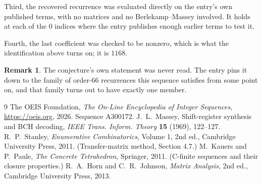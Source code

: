 \documentclass[11pt,a4paper]{article}
\theoremstyle{plain}
\theoremstyle{definition}
\newtheorem{remark}[theorem]{Remark}
\begin{document}
Third, the recovered recurrence was evaluated directly on the entry's own published terms, with
no matrices and no Berlekamp--Massey involved. It holds at each of the $0$ indices where
the entry publishes enough earlier terms to test it.

Fourth, the last coefficient was checked to be nonzero, which is what the identification above
turns on; it is $1168$.

\begin{remark}
The conjecture's own statement was never read. The entry pins it down to the family of
order-$66$ recurrences this sequence satisfies from some point on, and that family turns
out to have exactly one member.
\end{remark}

\begin{thebibliography}{9}
 The OEIS Foundation, \emph{The On-Line Encyclopedia of Integer
Sequences}, \url{https://oeis.org}, 2026. Sequence A300172.
 J.~L.~Massey, Shift-register synthesis and BCH decoding, \emph{IEEE
Trans. Inform. Theory} \textbf{15} (1969), 122--127.
 R.~P.~Stanley, \emph{Enumerative Combinatorics}, Volume 1, 2nd ed.,
Cambridge University Press, 2011. (Transfer-matrix method, Section 4.7.)
 M.~Kauers and P.~Paule, \emph{The Concrete Tetrahedron}, Springer, 2011.
(C-finite sequences and their closure properties.)
 R.~A.~Horn and C.~R.~Johnson, \emph{Matrix Analysis}, 2nd ed., Cambridge
University Press, 2013.
\end{thebibliography}
\end{document}
